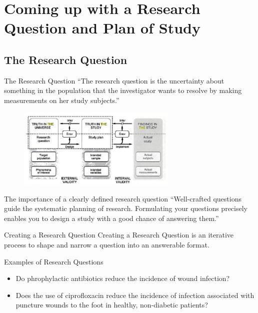 \documentclass[14pt]{beamer}
\begin{document}
\section{Coming up with a Research Question and Plan of Study}

\subsection{The Research Question}

\begin{frame}{The Research Question}
``The research question is the uncertainty about something in the population
that the investigator wants to resolve by making measurements on her
study subjects.'' \cite{Hulley2001}
\begin{figure}
\includegraphics[width=3in]{Screenshot.png}
\end{figure}
\end{frame}

\begin{frame}{The importance of a clearly defined research question}
``Well-crafted questions guide the systematic planning of research.  
Formulating your questions precisely enables you to design a study with a 
good chance of answering them.'' \cite{Light1990}
\end{frame}

\begin{frame}{Creating a Research Question}
Creating a Research Question is an iterative process to shape and narrow
a question into an answerable format.
\end{frame}

\begin{frame}{Examples of Research Questions}
\begin{itemize}
\item Do phrophylactic antibiotics reduce the incidence of wound infection?
\item Does the use of ciprofloxacin reduce the incidence of infection 
  associated with puncture wounds to the foot in healthy, non-diabetic patients?
\end{itemize}
\end{frame}
\end{document}

